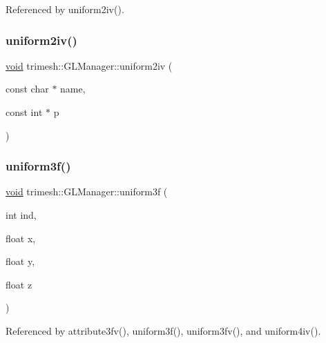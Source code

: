 Referenced by uniform2iv().

\mbox{\label{classtrimesh_1_1GLManager_acb09eac22ea6e1149bd70ef3fe53c228}} 
\subsubsection{\texorpdfstring{uniform2iv()}{uniform2iv()}\hspace{0.1cm}{\footnotesize\ttfamily [2/2]}}
{\footnotesize\ttfamily \hyperlink{namespacetrimesh_a784ddfd979e1c579bda795a8edfc3f43}{void} trimesh\+::\+G\+L\+Manager\+::uniform2iv (\begin{DoxyParamCaption}\item[{const char $\ast$}]{name,  }\item[{const int $\ast$}]{p }\end{DoxyParamCaption})\hspace{0.3cm}{\ttfamily [inline]}}

\mbox{\label{classtrimesh_1_1GLManager_adb4d26d33054ab95c0ed7768a1d0c068}} 
\subsubsection{\texorpdfstring{uniform3f()}{uniform3f()}\hspace{0.1cm}{\footnotesize\ttfamily [1/2]}}
{\footnotesize\ttfamily \hyperlink{namespacetrimesh_a784ddfd979e1c579bda795a8edfc3f43}{void} trimesh\+::\+G\+L\+Manager\+::uniform3f (\begin{DoxyParamCaption}\item[{int}]{ind,  }\item[{float}]{x,  }\item[{float}]{y,  }\item[{float}]{z }\end{DoxyParamCaption})}



Referenced by attribute3fv(), uniform3f(), uniform3fv(), and uniform4iv().

\mbox{\label{classtrimesh_1_1GLManager_a3089e468b5696dba6148548648f603ce}} 
